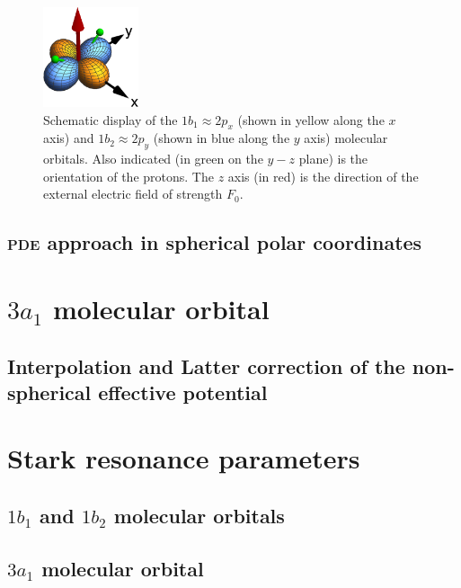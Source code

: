 \begin{figure}
  \centering
  \includegraphics[width=0.25\textwidth]{figures/ch_H2O/orbitals.eps}
  \caption{Schematic display of the $1b_{1}\approx 2p_{x}$ (shown in
    yellow along the $x$ axis) and $1b_{2}\approx 2p_{y}$ (shown in
    blue along the $y$ axis) molecular orbitals. Also indicated (in
    green on the $y-z$ plane) is the orientation of the protons. The
    $z$ axis (in red) is the direction of the external electric field
    of strength $F_{0}$.}
  \label{fig:h2o_1b1_1b2}
\end{figure}

\subsection{\textsc{pde} approach in spherical polar coordinates}

\section{$3a_{1}$ molecular orbital}
\label{ch:3a1}
\subsection{Interpolation and Latter correction of the
  non-spherical effective potential}




\section{Stark resonance parameters}
\label{ch:stark_params}
\subsection{$1b_{1}$ and $1b_{2}$ molecular orbitals}
\subsection{$3a_{1}$ molecular orbital}

